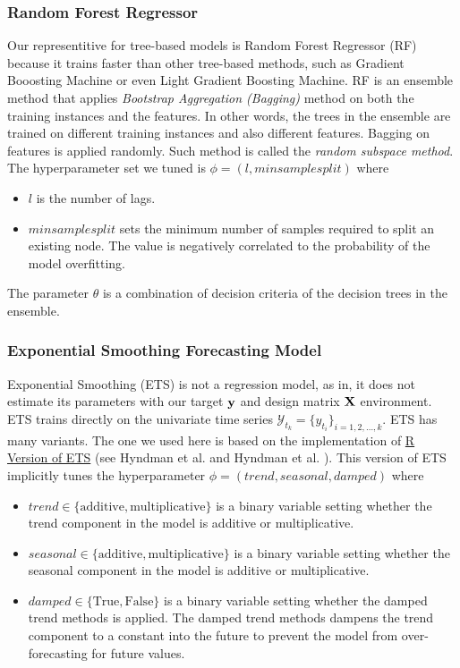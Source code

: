 \subsubsection{Random Forest Regressor}
Our representitive for tree-based models is Random Forest Regressor (RF) because it trains faster than other tree-based methods, such as Gradient Booosting Machine or even Light Gradient Boosting Machine. RF is an ensemble method that applies \textit{Bootstrap Aggregation (Bagging)} method on both the training instances and the features. In other words, the trees in the ensemble are trained on different training instances and also different features. Bagging on features is applied randomly. Such method is called the \textit{random subspace method}. The hyperparameter set we tuned is $\phi = (l, min sample split)$ where
\begin{itemize}
    \item $l$ is the number of lags.
    \item $min sample split$ sets the minimum number of samples required to split an existing node. The value is negatively correlated to the probability of the model overfitting.
\end{itemize}
The parameter $\theta$ is a combination of decision criteria of the decision trees in the ensemble.

\subsubsection{Exponential Smoothing Forecasting Model}
Exponential Smoothing (ETS) is not a regression model, as in, it does not estimate its parameters with our target $\mathbf{y}$ and design matrix $\mathbf{X}$ environment. ETS trains directly on the univariate time series $\mathcal{Y}_{t_k} = \{ y_{t_i}\}_{i = 1, 2, \ldots, k}$. ETS has many variants. The one we used here is based on the implementation of \href{https://www.rdocumentation.org/packages/forecast/versions/8.12/topics/ets}{R Version of ETS} (see Hyndman et al. \citeyear{hyndman2008admissible} and Hyndman et al. \citeyear{hyndman2008forecasting}). This version of ETS implicitly tunes the hyperparameter $\phi = (trend, seasonal, damped)$ where
\begin{itemize}
    \item $trend \in \{ \text{additive}, \text{multiplicative} \}$ is a binary variable setting whether the trend component in the model is additive or multiplicative.
    \item $seasonal \in \{ \text{additive}, \text{multiplicative} \}$ is a binary variable setting whether the seasonal component in the model is additive or multiplicative.
    \item $damped \in \{ \text{True}, \text{False} \}$ is a binary variable setting whether the damped trend methods is applied. The damped trend methods dampens the trend component to a constant into the future to prevent the model from over-forecasting for future values.
\end{itemize}

